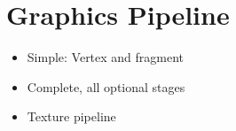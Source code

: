 \section{Graphics Pipeline}
\begin{itemize}
  \item Simple: Vertex and fragment
  \item Complete, all optional stages
  \item Texture pipeline
\end{itemize}
